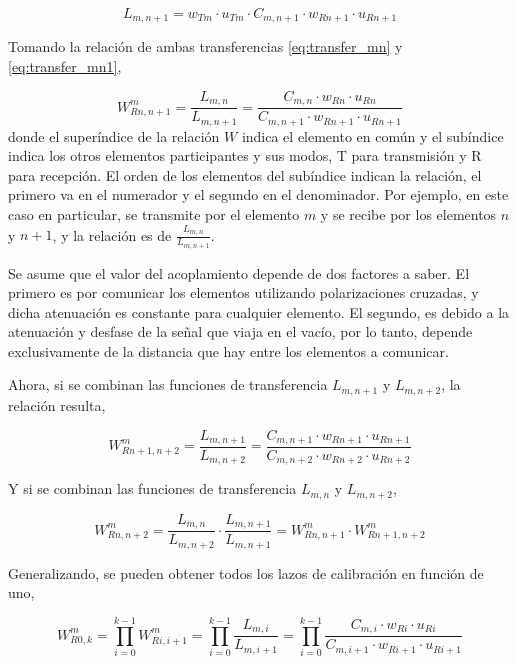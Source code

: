 \begin{equation}
	L_{m,n + 1} = w_{Tm} \cdot u_{Tm} \cdot C_{m,n + 1} \cdot w_{Rn + 1} \cdot u_{Rn + 1}
	\label{eq:transfer_mn1}
\end{equation}

Tomando la relación de ambas transferencias \ref{eq:transfer_mn} y \ref{eq:transfer_mn1}, 

\begin{equation}
	W^{m}_{Rn,n + 1} = \dfrac{L_{m,n}}{L_{m,n + 1}} = \dfrac{C_{m,n} \cdot w_{Rn} \cdot u_{Rn}}{C_{m,n + 1} \cdot w_{Rn + 1} \cdot u_{Rn + 1}}
\end{equation}
donde el superíndice de la relación $W$ indica el elemento en común y el subíndice indica los otros elementos participantes y
sus modos, T para transmisión y R para recepción. El orden de los elementos del subíndice indican la relación, el primero va
en el numerador y el segundo en el denominador. Por ejemplo, en este caso en particular, se transmite por el elemento $m$ y
se recibe por los elementos $n$ y $n+1$, y la relación es de $\frac{L_{m,n}}{L_{m,n + 1}}$.

Se asume que el valor del acoplamiento depende de dos factores a saber. El primero es por comunicar los elementos utilizando
polarizaciones cruzadas, y dicha atenuación es constante para cualquier elemento. El segundo, es debido a la atenuación y
desfase de la señal que viaja en el vacío, por lo tanto, depende exclusivamente de la distancia que hay entre los elementos
a comunicar.

Ahora, si se combinan las funciones de transferencia $L_{m,n+1}$ y $L_{m,n+2}$, la relación resulta,

\begin{equation}
	W^{m}_{Rn + 1,n + 2} = \dfrac{L_{m,n+1}}{L_{m,n+2}} = \dfrac{C_{m,n+1} \cdot w_{Rn+1} \cdot u_{Rn+1}}{C_{m,n + 2} \cdot w_{Rn + 2} \cdot u_{Rn + 2}}
\end{equation}

Y si se combinan las funciones de transferencia $L_{m,n}$ y $L_{m,n+2}$,

\begin{equation}
	W^{m}_{Rn,n + 2} = \dfrac{L_{m,n}}{L_{m,n + 2}}\cdot\dfrac{L_{m,n+1}}{L_{m,n+1}} = W^{m}_{Rn,n+1}\cdot W^{m}_{Rn+1,n + 2}
\end{equation}


Generalizando, se pueden obtener todos los lazos de calibración en función de uno,

\begin{equation}
	W^{m}_{R0,k} = \prod_{i=0}^{k-1} W^{m}_{Ri,i+1} = \prod_{i=0}^{k-1}\dfrac{L_{m,i}}{L_{m,i+1}} =
		\prod_{i=0}^{k-1}\dfrac{C_{m,i} \cdot w_{Ri} \cdot u_{Ri}}{C_{m,i + 1} \cdot w_{Ri + 1} \cdot u_{Ri + 1}}
	\label{eq:rx_cal}
\end{equation}

